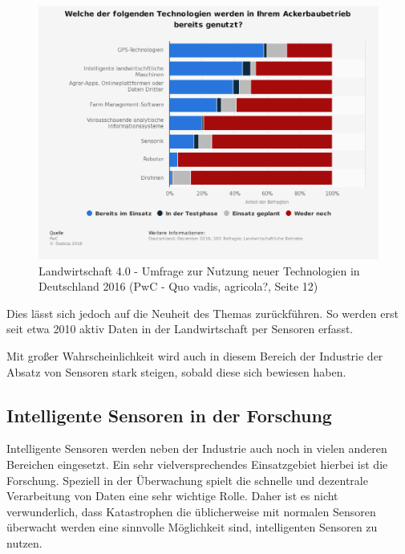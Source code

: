 \documentclass[a4paper,12pt]{scrartcl}
\begin{document}
\begin{figure}[H]
\centering
\includegraphics[scale=0.45]{picture/Landwirtschaft}
\caption{Landwirtschaft 4.0 - Umfrage zur Nutzung neuer Technologien in Deutschland 2016 (PwC - Quo vadis, agricola?, Seite 12)}
\label{fig:Landwirtschaft 4.0 - Umfrage zur Nutzung neuer Technologien in Deutschland 2016}
\end{figure}

Dies lässt sich jedoch auf die Neuheit des Themas zurückführen. So werden erst seit etwa 2010 aktiv Daten in der Landwirtschaft per Sensoren erfasst.
\cite[Seite 6]{Navulur.2017}

Mit großer Wahrscheinlichkeit wird auch in diesem Bereich der Industrie der Absatz von Sensoren stark steigen, sobald diese sich bewiesen haben.
\cite{ComarchAG.}

\newpage
\subsection{Intelligente Sensoren in der Forschung}
Intelligente Sensoren werden neben der Industrie auch noch in vielen anderen Bereichen eingesetzt. Ein sehr vielversprechendes Einsatzgebiet hierbei ist die Forschung. Speziell in der Überwachung spielt die schnelle und dezentrale Verarbeitung von Daten eine sehr wichtige Rolle. Daher ist es nicht verwunderlich, dass Katastrophen die üblicherweise mit normalen Sensoren überwacht werden eine sinnvolle Möglichkeit sind, intelligenten Sensoren zu nutzen. 
\end{document}
